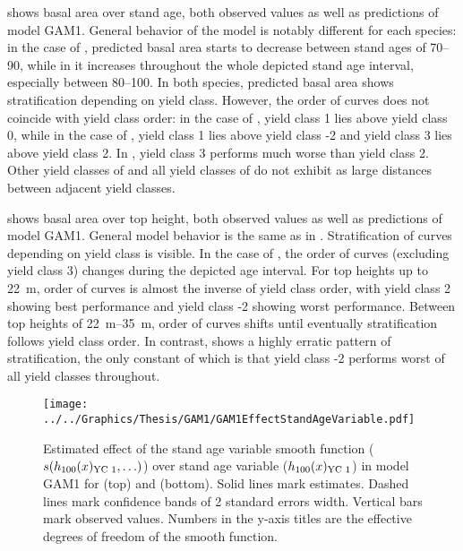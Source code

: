  shows basal area over stand age, both observed values as well as predictions of model GAM1.  General behavior of the model is notably different for each species:  in the case of \Beech{}, predicted basal area starts to decrease between stand ages of \SIrange{70}{90}{\year}, while in \Spruce{} it increases throughout the whole depicted stand age interval, especially between \SIrange{80}{100}{\year}.  In both species, predicted basal area shows stratification depending on yield class.  However, the order of curves does not coincide with yield class order:  in the case of \Beech{}, yield class 1 lies above yield class 0, while in the case of \Spruce{}, yield class 1 lies above yield class -2 and yield class 3 lies above yield class 2.  In \Beech{}, yield class 3 performs much worse than yield class 2.  Other yield classes of \Beech{} and all yield classes of \Spruce{} do not exhibit as large distances between adjacent yield classes. 

 shows basal area over top height, both observed values as well as predictions of model GAM1.  General model behavior is the same as in .  Stratification of curves depending on yield class is visible.  In the case of \Beech{}, the order of curves (excluding yield class 3) changes during the depicted age interval.  For top heights up to \SI{22}{\meter}, order of curves is almost the inverse of yield class order, with yield class 2 showing best performance and yield class -2 showing worst performance.  Between top heights of \SIrange{22}{35}{\meter}, order of curves shifts until eventually stratification follows yield class order.  In contrast, \Spruce{} shows a highly erratic pattern of stratification, the only constant of which is that yield class -2 performs worst of all yield classes throughout.

\begin{figure}[h]
  \centering
  \texttt{[image: ../../Graphics/Thesis/GAM1/GAM1EffectStandAgeVariable.pdf]}
  \caption{Estimated effect of the stand age variable smooth function (\(s(h_{100}(x)_{\text{YC 1}}{}, \ldots)\)) over stand age variable (\(h_{100}(x)_{\text{YC 1}}{}\)) in model GAM1 for \Beech{} (top) and \Spruce{} (bottom).  Solid lines mark estimates.  Dashed lines mark confidence bands of 2 standard errors width.  Vertical bars mark observed values.  Numbers in the y-axis titles are the effective degrees of freedom of the smooth function.}
  \label{fig:GAM1EffectStandAgeVariable}
\end{figure}

